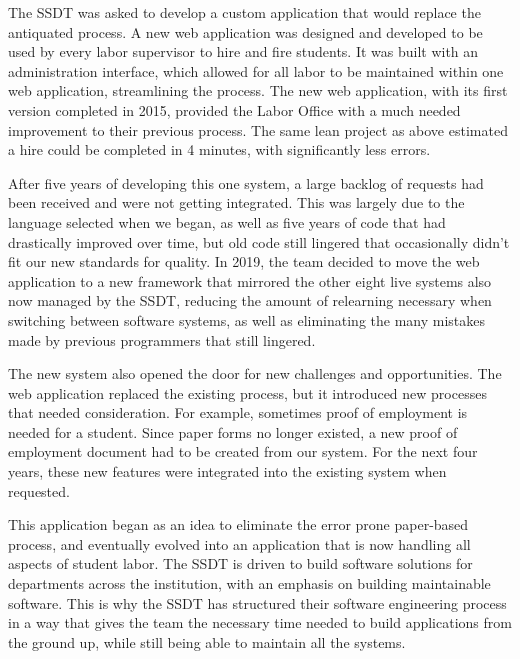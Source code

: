 The SSDT was asked to develop a custom application that would replace the antiquated process. A new web application was designed and developed to be used by every labor supervisor to hire and fire students. It was built with an administration interface, which allowed for all labor to be maintained within one web application, streamlining the process. The new web application, with its first version completed in 2015, provided the Labor Office with a much needed improvement to their previous process. The same lean project as above estimated a hire could be completed in 4 minutes, with significantly less errors.

After five years of developing this one system, a large backlog of requests had been received and were not getting integrated. This was largely due to the language selected when we began, as well as five years of code that had drastically improved over time, but old code still lingered that occasionally didn't fit our new standards for quality. In 2019, the team decided to move the web application to a new framework that mirrored the other eight live systems also now managed by the SSDT, reducing the amount of relearning necessary when switching between software systems, as well as eliminating the many mistakes made by previous programmers that still lingered.

The new system also opened the door for new challenges and opportunities. The web application replaced the existing process, but it introduced new processes that needed consideration. For example, sometimes proof of employment is needed for a student. Since paper forms no longer existed, a new proof of employment document had to be created from our system. For the next four years, these new features were integrated into the existing system when requested.

This application began as an idea to eliminate the error prone paper-based process, and eventually evolved into an application that is now handling all aspects of student labor. The SSDT is driven to build software solutions for departments across the institution, with an emphasis on building maintainable software. This is why the SSDT has structured their software engineering process in a way that gives the team the necessary time needed to build applications from the ground up, while still being able to maintain all the systems.
